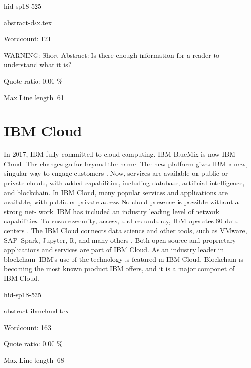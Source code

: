 \begin{IU}

hid-sp18-525

\href{https://github.com/cloudmesh-community/hid-sp18-525/blob/master//technology/abstract-dsx.tex}{abstract-dsx.tex}

 

Wordcount: 121

WARNING: Short Abstract: Is there enough information for a reader to understand what it is?


Quote ratio: 0.00 \%
 
Max Line length: 61
\end{IU}

\section{IBM Cloud}


In 2017, IBM fully committed to cloud computing. IBM BlueMix
is now IBM Cloud. The changes go far beyond the name. The new 
platform gives IBM a new, singular way to engage customers 
\cite{hid-sp18-525-cloud}. Now, services are available on public or 
private clouds, with added capabilities, including database, 
artificial intelligence, and blockchain\cite{hid-sp18-525-cloud}.
In IBM Cloud, many popular services and applications are 
available, with public or private access No cloud presence 
is possible without a strong net- work. IBM has included an 
industry leading level of network capabilities. To ensure 
security, access, and redundancy, IBM operates 60 data centers 
\cite{hid-sp18-525-cloud}.
The IBM Cloud connects data science and other tools, such as 
VMware, SAP, Spark, Jupyter, R, and many others 
\cite{hid-sp18-525-cloud}. Both open source and proprietary 
applications and services are part of IBM Cloud.
As an industry leader in blockchain, IBM’s use of the 
technology is featured in IBM Cloud. Blockchain is becoming 
the most known product IBM offers, and it is a major componet
of IBM Cloud\cite{hid-sp18-525-cloud}.


\begin{IU}

hid-sp18-525

\href{https://github.com/cloudmesh-community/hid-sp18-525/blob/master//technology/abstract-ibmcloud.tex}{abstract-ibmcloud.tex}

 

Wordcount: 163


Quote ratio: 0.00 \%
 
Max Line length: 68
\end{IU}

